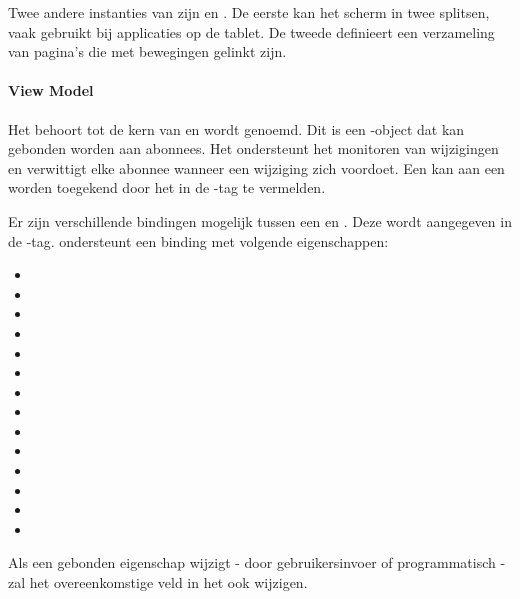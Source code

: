 Twee andere instanties van  zijn  en .
De eerste kan het scherm in twee  splitsen,  vaak gebruikt bij applicaties op de tablet.
De tweede definieert een verzameling van pagina's die met  bewegingen gelinkt zijn.

\paragraph{View Model}
Het  behoort tot de kern van \kendo{} en wordt  genoemd.
Dit is een \js{}-object dat kan gebonden worden aan abonnees.
Het ondersteunt het monitoren van wijzigingen en verwittigt elke abonnee wanneer een wijziging zich voordoet.
Een  kan aan een  worden toegekend door het in de -tag te vermelden.

Er zijn verschillende bindingen	 mogelijk tussen een  en .
Deze wordt aangegeven in de -tag.
\kendo{} ondersteunt een binding met volgende eigenschappen:  
\begin{itemize}
  \item {}
  \item {}
  \item {}
  \item {}
  \item {}
  \item {}
  \item {}
  \item {}
  \item {}
  \item {}
  \item {}
  \item {}
  \item {}
  \item {}
\end{itemize}
Als een gebonden eigenschap wijzigt - door gebruikersinvoer of programmatisch - zal het overeenkomstige veld in het  ook wijzigen.

